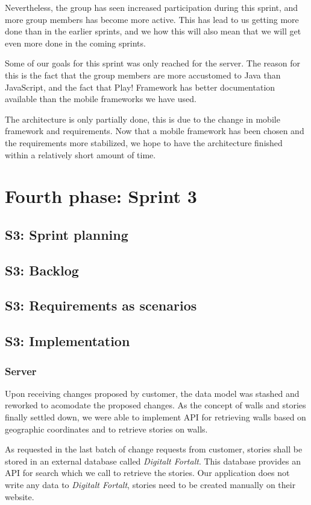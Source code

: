 \documentclass[11pt]{book}
\begin{document}
Nevertheless, the group has seen increased participation during this sprint, and more group members has become more active. This has lead to us getting more done than in the earlier sprints, and we how this will also mean that we will get even more done in the coming sprints.

Some of our goals for this sprint was only reached for the server. The reason for this is the fact that the group members are more accustomed to Java than JavaScript, and the fact that Play! Framework has better documentation available than the mobile frameworks we have used.

The architecture is only partially done, this is due to the change in mobile framework and requirements. Now that a mobile framework has been chosen and the requirements more stabilized, we hope to have the architecture finished within a relatively short amount of time.

\section{Fourth phase: Sprint 3}
\subsection{S3: Sprint planning}
\subsection{S3: Backlog}
\subsection{S3: Requirements as scenarios}

\subsection{S3: Implementation}

\subsubsection{Server}

Upon receiving changes proposed by customer, the data model was stashed and reworked to acomodate the proposed changes. As the concept of walls and stories finally settled down, we were able to implement API for retrieving walls based on geographic coordinates and to retrieve stories on walls.

As requested in the last batch of change requests from customer, stories shall be stored in an external database called \emph{Digitalt Fortalt}. This database provides an API for search which we call to retrieve the stories. Our application does not write any data to \emph{Digitalt Fortalt}, stories need to be created manually on their website.
\end{document}
